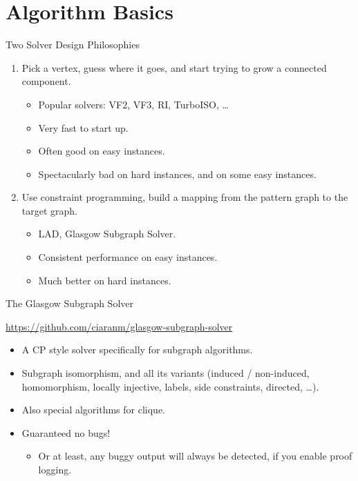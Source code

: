 \documentclass[aspectratio=169,compress,10pt]{beamer}
\begin{document}
\section{Algorithm Basics}

\begin{frame}{Two Solver Design Philosophies}
    \begin{enumerate}
        \item Pick a vertex, guess where it goes, and start trying to grow a connected component.
            \begin{itemize}
                \item Popular solvers: VF2, VF3, RI, TurboISO, \ldots
                \item Very fast to start up.
                \item Often good on easy instances.
                \item Spectacularly bad on hard instances, and on some easy instances.
            \end{itemize}
        \item Use constraint programming, build a mapping from the pattern graph to the target
            graph.
            \begin{itemize}
                \item LAD, Glasgow Subgraph Solver.
                \item Consistent performance on easy instances.
                \item Much better on hard instances.
            \end{itemize}
    \end{enumerate}
\end{frame}

\begin{frame}{The Glasgow Subgraph Solver}
    \begin{center}
        \url{https://github.com/ciaranm/glasgow-subgraph-solver}
    \end{center}

    \begin{itemize}
        \item A CP style solver specifically for subgraph algorithms.
        \item Subgraph isomorphism, and all its variants (induced / non-induced, homomorphism,
            locally injective, labels, side constraints, directed, \ldots).
        \item Also special algorithms for clique.
        \item Guaranteed no bugs!
            \begin{itemize}
                \item<2-> Or at least, any buggy output will always be detected, if you enable proof
                    logging.
            \end{itemize}
    \end{itemize}
\end{frame}
\end{document}
